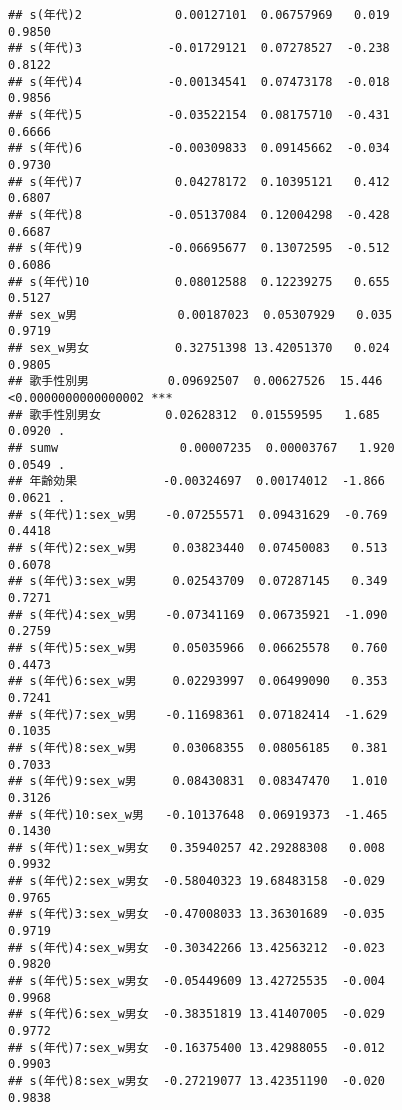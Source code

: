 \documentclass[
]{article}
\begin{document}
\begin{verbatim}
## s(年代)2             0.00127101  0.06757969   0.019              0.9850    
## s(年代)3            -0.01729121  0.07278527  -0.238              0.8122    
## s(年代)4            -0.00134541  0.07473178  -0.018              0.9856    
## s(年代)5            -0.03522154  0.08175710  -0.431              0.6666    
## s(年代)6            -0.00309833  0.09145662  -0.034              0.9730    
## s(年代)7             0.04278172  0.10395121   0.412              0.6807    
## s(年代)8            -0.05137084  0.12004298  -0.428              0.6687    
## s(年代)9            -0.06695677  0.13072595  -0.512              0.6086    
## s(年代)10            0.08012588  0.12239275   0.655              0.5127    
## sex_w男              0.00187023  0.05307929   0.035              0.9719    
## sex_w男女            0.32751398 13.42051370   0.024              0.9805    
## 歌手性別男           0.09692507  0.00627526  15.446 <0.0000000000000002 ***
## 歌手性別男女         0.02628312  0.01559595   1.685              0.0920 .  
## sumw                 0.00007235  0.00003767   1.920              0.0549 .  
## 年齢効果            -0.00324697  0.00174012  -1.866              0.0621 .  
## s(年代)1:sex_w男    -0.07255571  0.09431629  -0.769              0.4418    
## s(年代)2:sex_w男     0.03823440  0.07450083   0.513              0.6078    
## s(年代)3:sex_w男     0.02543709  0.07287145   0.349              0.7271    
## s(年代)4:sex_w男    -0.07341169  0.06735921  -1.090              0.2759    
## s(年代)5:sex_w男     0.05035966  0.06625578   0.760              0.4473    
## s(年代)6:sex_w男     0.02293997  0.06499090   0.353              0.7241    
## s(年代)7:sex_w男    -0.11698361  0.07182414  -1.629              0.1035    
## s(年代)8:sex_w男     0.03068355  0.08056185   0.381              0.7033    
## s(年代)9:sex_w男     0.08430831  0.08347470   1.010              0.3126    
## s(年代)10:sex_w男   -0.10137648  0.06919373  -1.465              0.1430    
## s(年代)1:sex_w男女   0.35940257 42.29288308   0.008              0.9932    
## s(年代)2:sex_w男女  -0.58040323 19.68483158  -0.029              0.9765    
## s(年代)3:sex_w男女  -0.47008033 13.36301689  -0.035              0.9719    
## s(年代)4:sex_w男女  -0.30342266 13.42563212  -0.023              0.9820    
## s(年代)5:sex_w男女  -0.05449609 13.42725535  -0.004              0.9968    
## s(年代)6:sex_w男女  -0.38351819 13.41407005  -0.029              0.9772    
## s(年代)7:sex_w男女  -0.16375400 13.42988055  -0.012              0.9903    
## s(年代)8:sex_w男女  -0.27219077 13.42351190  -0.020              0.9838    

\end{verbatim}
\end{document}
